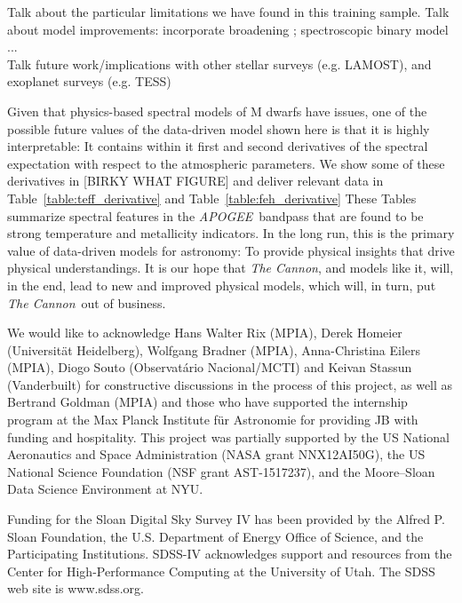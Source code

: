 \documentclass[modern]{aastex62}
\newcommand{\apogee}{\textsl{APOGEE}}
\newcommand{\thecannon}{\textsl{The Cannon}}
\begin{document}
Talk about the particular limitations we have found in this training sample. Talk about model improvements: incorporate broadening \citep{Behmard2019}; spectroscopic binary model \citep{ElBadry:2018}... \\

Talk future work/implications with other stellar surveys (e.g. LAMOST), and exoplanet surveys (e.g. TESS)

Given that physics-based spectral models of M dwarfs have issues, one of the possible
future values of the data-driven model shown here is that it is highly interpretable:
It contains within it first and second derivatives of the spectral expectation with
respect to the atmospheric parameters.
We show some of these derivatives in [BIRKY WHAT FIGURE] and deliver relevant data in
Table~\ref{table:teff_derivative} and Table~\ref{table:feh_derivative}
These Tables summarize spectral features in the \apogee\ bandpass
that are found to be strong temperature and metallicity indicators.
In the long run, this is the primary value of data-driven models for astronomy:
To provide physical insights that drive physical understandings.
It is our hope that \thecannon, and models like it, will, in the end, lead to
new and improved physical models, which will, in turn, put \thecannon\ out of business.

\acknowledgements
We would like to acknowledge Hans Walter Rix (MPIA), Derek Homeier (Universit{\"a}t Heidelberg), Wolfgang Bradner (MPIA), Anna-Christina Eilers (MPIA), Diogo Souto (Observatário Nacional/MCTI) and Keivan Stassun (Vanderbuilt) for constructive discussions in the process of this project, as well as Bertrand Goldman (MPIA) and those who have supported the internship program at the Max Planck Institute f{\"u}r Astronomie for providing JB with funding and hospitality.
This project was partially supported by
the US National Aeronautics and Space Administration (NASA grant NNX12AI50G),
the US National Science Foundation (NSF grant AST-1517237),
and the Moore--Sloan Data Science Environment at NYU.

Funding for the Sloan Digital Sky Survey IV has been provided by the Alfred P. Sloan Foundation, the U.S. Department of Energy Office of Science, and the Participating Institutions. SDSS-IV acknowledges support and resources from the Center for High-Performance Computing at
the University of Utah. The SDSS web site is www.sdss.org.
\end{document}
